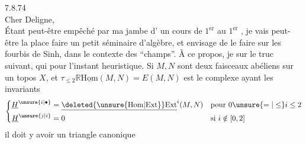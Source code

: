 
  7.8.74\\
Cher Deligne,\\

Étant peut-être empêché par ma jambe d' un cours de $1^{\mathrm{er}}$  au $1^{\mathrm{er}}$ , je vais peut-être  la place faire un petit séminaire d'algèbre, et envisage de le faire sur les fourbis de  Sinh,   dans le contexte des ``champs''. À ce propos, je  sur le truc suivant,
qui pour l'instant  heuristique. Si $M,N$ sont deux faisceaux abéliens sur un topos $X$, et $\tau_{\leq 2}\mathbb{R}\underline{\mathrm{Hom}}(M,N)=E(M,N)$ est le complexe ayant les invariants
\[
\left\{\begin{aligned}
\underline{H}^{\unsure{i|\bullet}}&=\underline{\deleted{\unsure{\mathrm{Hom}|\mathrm{Ext}}}\mathrm{Ext}}^{i}(M,N) &&\text{pour }0\unsure{=|\leq}i\leq 2\\
\underline{H}^{\unsure{j|i}}&=0 &&\text{si }i\notin[0,2]
\end{aligned}\right.
\]
il doit y avoir un triangle  canonique

